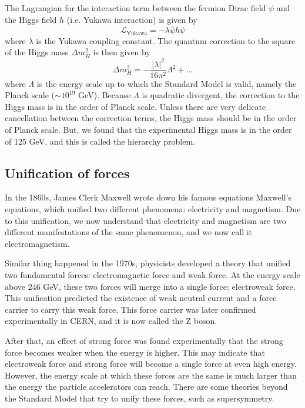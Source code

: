 The Lagrangian for the interaction term between the fermion Dirac field $\psi$ and the Higgs field $h$ (i.e. Yukawa interaction) is given by
\begin{equation}
\mathcal{L}_{\text{Yukawa}} = - \lambda \bar{\psi} h \psi
\end{equation}
where $\lambda$ is the Yukawa coupling constant.
The quantum correction to the square of the Higgs mass $\Delta m^2_H$ is then given by
\begin{equation}
\Delta m^2_H = - \frac{|\lambda|^2}{16 \pi^2} \Lambda^2 + \dots
\label{eq:higgs_correction}
\end{equation}
where $\Lambda$ is the energy scale up to which the Standard Model is valid, namely the Planck scale ($\sim 10^{19}$ GeV).
Because $\Lambda$ is quadratic divergent, the correction to the Higgs mass is in the order of Planck scale.
Unless there are very delicate cancellation between the correction terms, the Higgs mass should be in the order of Planck scale.
But, we found that the experimental Higgs mass is in the order of 125 GeV, and this is called the hierarchy problem.

\subsection{Unification of forces}
In the 1860s, James Clerk Maxwell wrote down his famous equations Maxwell's equations, which unified two different phenomena: electricity and magnetism.
Due to this unification, we now understand that electricity and magnetism are two different manifestations of the same phenomenon, and we now call it electromagnetism.

Similar thing happened in the 1970s, physicists developed a theory that unified two fundamental forces: electromagnetic force and weak force.
At the energy scale above 246 GeV, these two forces will merge into a single force: electroweak force.
This unification predicted the existence of weak neutral current and a force carrier to carry this weak force.
This force carrier was later confirmed experimentally in CERN, and it is now called the Z boson.

After that, an effect of strong force was found experimentally that the strong force becomes weaker when the energy is higher.
This may indicate that electroweak force and strong force will become a single force at even high energy.
However, the energy scale at which these forces are the same is much larger than the energy the particle accelerators can reach.
There are some theories beyond the Standard Model that try to unify these forces, such as supersymmetry.

